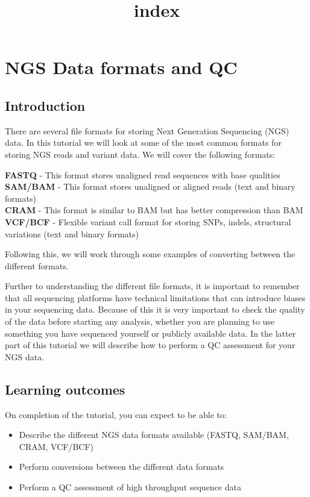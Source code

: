 \documentclass[11pt]{article}
\title{index}
\providecommand{\tightlist}{%
      \setlength{\itemsep}{0pt}\setlength{\parskip}{0pt}}
\begin{document}
    \hypertarget{ngs-data-formats-and-qc}{%
\section{NGS Data formats and QC}\label{ngs-data-formats-and-qc}}

\hypertarget{introduction}{%
\subsection{Introduction}\label{introduction}}

There are several file formats for storing Next Generation Sequencing
(NGS) data. In this tutorial we will look at some of the most common
formats for storing NGS reads and variant data. We will cover the
following formats:

\textbf{FASTQ} - This format stores unaligned read sequences with base
qualities\\
\textbf{SAM/BAM} - This format stores unaligned or aligned reads (text
and binary formats)\\
\textbf{CRAM} - This format is similar to BAM but has better compression
than BAM\\
\textbf{VCF/BCF} - Flexible variant call format for storing SNPs,
indels, structural variations (text and binary formats)

Following this, we will work through some examples of converting between
the different formats.

Further to understanding the different file formats, it is important to
remember that all sequencing platforms have technical limitations that
can introduce biases in your sequencing data. Because of this it is very
important to check the quality of the data before starting any analysis,
whether you are planning to use something you have sequenced yourself or
publicly available data. In the latter part of this tutorial we will
describe how to perform a QC assessment for your NGS data.

\hypertarget{learning-outcomes}{%
\subsection{Learning outcomes}\label{learning-outcomes}}

On completion of the tutorial, you can expect to be able to:

\begin{itemize}
\tightlist
\item
  Describe the different NGS data formats available (FASTQ, SAM/BAM,
  CRAM, VCF/BCF)
\item
  Perform conversions between the different data formats
\item
  Perform a QC assessment of high throughput sequence data
\end{itemize}
\end{document}

